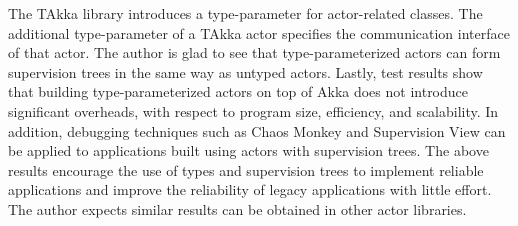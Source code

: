 The TAkka library introduces a type-parameter for actor-related classes. The 
additional type-parameter of a TAkka actor specifies the communication 
interface of that actor.  The author is glad to see that type-parameterized 
actors can form supervision trees in the same way as untyped actors.
Lastly, test results show that building type-parameterized actors on top of 
Akka does not introduce significant overheads, with respect to program size,
efficiency, and scalability.  In addition, debugging techniques such 
as Chaos Monkey and Supervision View can be applied to applications built 
using actors with supervision trees.  The above results encourage the use of 
types and supervision trees to implement reliable applications and improve the 
reliability of legacy applications with little effort.  The author expects 
similar results can be obtained in other actor libraries.




